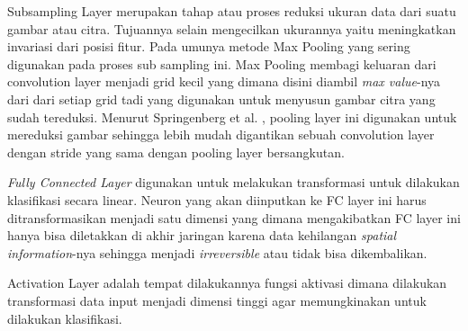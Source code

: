 \par Subsampling Layer merupakan tahap atau proses reduksi ukuran data dari suatu gambar atau citra. Tujuannya selain mengecilkan
ukurannya yaitu meningkatkan invariasi dari posisi fitur. Pada umunya metode Max Pooling yang sering digunakan pada proses sub sampling ini.
Max Pooling membagi keluaran dari convolution layer menjadi grid kecil yang dimana disini diambil \emph{max value}-nya dari dari setiap grid
tadi yang digunakan untuk menyusun gambar citra yang sudah tereduksi. Menurut Springenberg et al. \cite{springenberg2014striving}, pooling layer ini digunakan
untuk mereduksi gambar sehingga lebih mudah digantikan sebuah convolution layer dengan stride yang sama dengan pooling layer
bersangkutan\cite{putra2016klasifikasi}.

\par \emph{Fully Connected Layer} digunakan untuk melakukan transformasi untuk dilakukan klasifikasi secara linear.
Neuron yang akan diinputkan ke FC layer ini harus ditransformasikan menjadi satu dimensi yang dimana
mengakibatkan FC layer ini hanya bisa diletakkan di akhir jaringan karena data kehilangan \emph{spatial information}-nya
sehingga menjadi \emph{irreversible} atau tidak bisa dikembalikan.

\par Activation Layer adalah tempat dilakukannya fungsi aktivasi dimana dilakukan transformasi data input
menjadi dimensi tinggi agar memungkinakan untuk dilakukan klasifikasi\cite{putra2016klasifikasi}.






